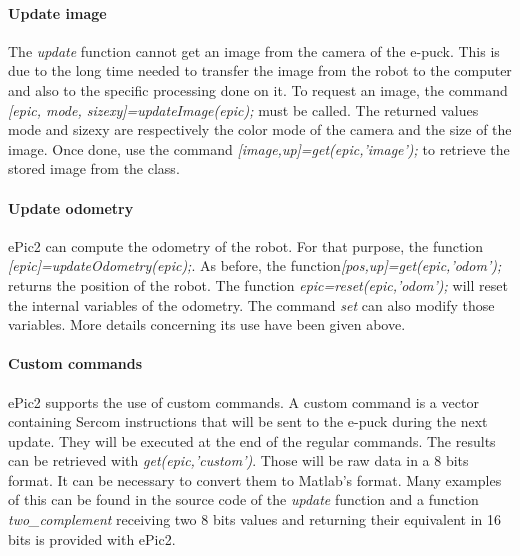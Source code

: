 \documentclass[11pt,oneside,english,a4paper]{article}
\begin{document}
\paragraph{Update image}
The \emph{update} function cannot get an image from the camera of the e-puck. This is due to the long time needed to transfer the image from the robot to the computer and also to the specific processing done on it. To request an image, the command \emph{[epic, mode, sizexy]=updateImage(epic);} must be called. The returned values mode and sizexy are respectively the color mode of the camera and the size of the image. Once done, use the command \emph{[image,up]=get(epic,'image');} to retrieve the stored image from the class.

\paragraph{Update odometry}
ePic2 can compute the odometry of the robot. For that purpose, the function \emph{[epic]=updateOdometry(epic);}. As before, the function\emph{[pos,up]=get(epic,'odom');} returns the position of the robot. The function \emph{epic=reset(epic,'odom');} will reset the internal variables of the odometry. The command \emph{set} can also modify those variables. More details concerning its use have been given above.

\paragraph{Custom commands}
ePic2 supports the use of custom commands. A custom command is a vector containing Sercom instructions that will be sent to the e-puck during the next update. They will be executed at the end of the regular commands. The results can be retrieved with \emph{get(epic,'custom')}. Those will be raw data in a 8 bits format. It can be necessary to convert them to Matlab's format. Many examples of this can be found in the source code of the \emph{update} function and a function \emph{two\_complement} receiving two 8 bits values and returning their equivalent in 16 bits is provided with ePic2.
\end{document}
